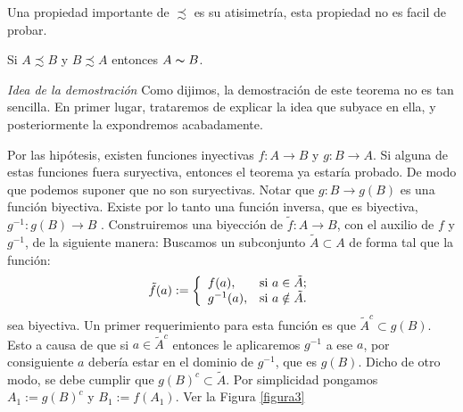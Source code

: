 Una propiedad importante de $\precsim$ es su atisimetría,
esta propiedad no es facil de probar.

\begin{teorema}\label{scho-ber} Si
$A\precsim B$ y $B\precsim A$ entonces $A\thicksim B$.
\end{teorema}

\noindent\emph{Idea de la demostración} Como dijimos, la
demostración de este teorema  no es tan sencilla. En primer
lugar, trataremos de explicar la idea que subyace en ella,  y
posteriormente la expondremos acabadamente.

Por las hipótesis, existen funciones inyectivas
$f:A\longrightarrow B$ y $g:B\longrightarrow A$. Si alguna de
estas funciones fuera suryectiva, entonces el teorema ya
estaría probado. De modo que podemos suponer que no son
suryectivas. Notar que $g:B\longrightarrow g(B)$ es una función
biyectiva.  Existe por lo tanto una
función inversa, que es biyectiva, $g^{-1}:g(B)\longrightarrow
B$ . Construiremos una biyección de $\tilde{f}:A\longrightarrow
B$, con el auxilio de $f$ y $g^{-1}$, de la siguiente manera:
Buscamos un subconjunto $\tilde{A}\subset A$ de forma tal que la
función:
\begin{equation}\label{ftilde}
\tilde{f}(a):=\left\{%
\begin{array}{ll}
    f(a), & \hbox{si $a\in \tilde{A}$;} \\
    g^{-1}(a), & \hbox{si $a\notin\tilde{A}$.} \\
\end{array}%
\right.
\end{equation}
sea biyectiva. Un primer requerimiento para esta función es que
$\tilde{A}^c\subset g(B)$. Esto a causa de que si
$a\in\tilde{A}^c$ entonces le aplicaremos $g^{-1}$ a ese $a$, por
consiguiente $a$ debería estar en el dominio de $g^{-1}$, que
es $g(B)$. Dicho de otro modo, se debe cumplir que
$g(B)^c\subset\tilde{A}$. Por simplicidad pongamos $A_1:=g(B)^c$ y
$B_1:=f(A_1)$. Ver la Figura \vref{figura3}


